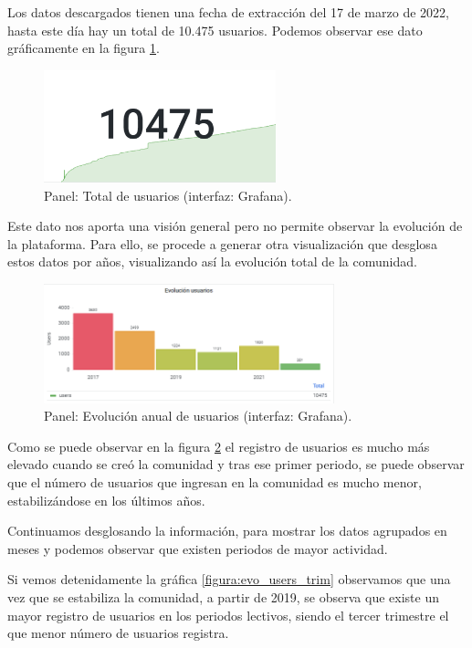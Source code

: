 \documentclass[a4paper, 12pt]{book}
\begin{document}
Los datos descargados tienen una fecha de extracción del 17 de marzo de 2022, hasta este día hay un total de 10.475 usuarios. Podemos observar ese dato gráficamente en la figura  \ref{figura:total_users}. 

\begin{figure}[ht]
    \centering
    \includegraphics[width=0.6\textwidth]{img/cse/Total_usuarios.png}
    \caption{Panel: Total de usuarios (interfaz: Grafana).}
    \label{figura:total_users}
\end{figure}


Este dato nos aporta una visión general pero no permite observar la evolución de la plataforma. Para ello, se procede a generar otra visualización que desglosa estos datos por años, visualizando así la evolución total de la comunidad.

\begin{figure}[ht]
    \centering
    \includegraphics[width=0.75\textwidth]{img/cse/evolucion_usuarios.png}
    \caption{Panel: Evolución anual de usuarios (interfaz: Grafana).}
    \label{figura:evo_users}
\end{figure}

Como se puede observar en la figura \ref{figura:evo_users} el registro de usuarios es mucho más elevado cuando se creó la comunidad y tras ese primer periodo, se puede observar que el número de usuarios que ingresan en la comunidad es mucho menor, estabilizándose en los últimos años.

Continuamos desglosando la información, para mostrar los datos agrupados en meses y podemos observar que existen periodos de mayor actividad.

Si vemos detenidamente la gráfica \ref{figura:evo_users_trim} observamos que una vez que se estabiliza la comunidad, a partir de 2019, se observa que existe un mayor registro de usuarios en los periodos lectivos, siendo el tercer trimestre el que menor número de usuarios registra. 
\end{document}
